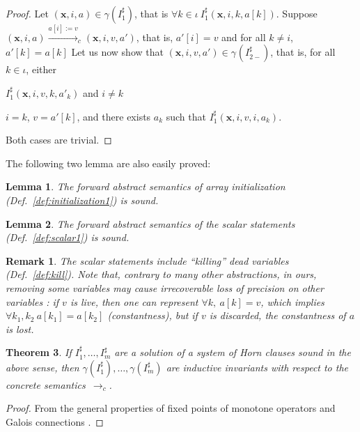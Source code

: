 \documentclass[a4paper]{article}
\newcommand{\ve}[1]{\mathbf{#1}}
\newcommand{\vx}{\ve{x}}
\newcommand{\abstr}[1]{#1^\sharp}
\newcommand{\concretization}[2][]{\gamma_{#1}\left(#2\right)}
\theoremstyle{definition}
\theoremstyle{plain}
\newtheorem{theorem}{Theorem}
\newtheorem{lemma}[theorem]{Lemma}
\newtheorem{remark}{Remark}
\begin{document}
\begin{proof}
Let $(\vx,i,a) \in \gamma(\abstr{I}_1)$, that is
$\forall k \in \iota~ \abstr{I}_1(\vx,i,k,a[k])$.
Suppose $(\vx,i,a) \xrightarrow{a[i]:=v}_c (\vx,i,v,a')$, that is, $a'[i]=v$ and for all $k \neq i$, $a'[k]=a[k]$
Let us now show that $(\vx,i,v,a') \in \concretization{\abstr{I}_{2-}}$, that is,  for all $k \in \iota$, either
\begin{inparaenum}[i)]
\item $\abstr{I}_1(\vx,i,v,k,a'_k)$ and $i\neq k$
\item $i=k$, $v=a'[k]$, and there exists $a_k$ such that $\abstr{I}_1(\vx,i,v,i,a_k)$.
\end{inparaenum}
Both cases are trivial.
\end{proof}

The following two lemma are also easily proved:
\begin{lemma}
The forward abstract semantics of array initialization (Def.~\ref{def:initialization1}) is sound.
\end{lemma}

\begin{lemma}
The forward abstract semantics of the scalar statements (Def.~\ref{def:scalar1}) is sound.
\end{lemma}

\begin{remark}
The scalar statements include ``killing'' dead variables (Def.~\ref{def:kill}).
Note that, contrary to many other abstractions, in ours, removing some variables may cause irrecoverable loss of precision on other variables \cite[Sec.~4.2]{Monniaux_Alberti_SAS2015}:
if $v$ is live, then one can represent $\forall k,~ a[k]=v$, which implies $\forall k_1,k_2~ a[k_1] = a[k_2]$ (constantness), but if $v$ is discarded, the constantness of $a$ is lost.
\end{remark}

\begin{theorem}
If $\abstr{I}_1,\dots,\abstr{I}_m$ are a solution of a system of Horn clauses sound in the above sense, then $\gamma(\abstr{I}_1),\dots,\gamma(\abstr{I}_m)$ are inductive invariants with respect to the concrete semantics~$\rightarrow_c$.
\end{theorem}

\begin{proof}
From the general properties of fixed points of monotone operators and Galois connections \cite{DBLP:journals/logcom/CousotC92}.
\end{proof}
\end{document}
